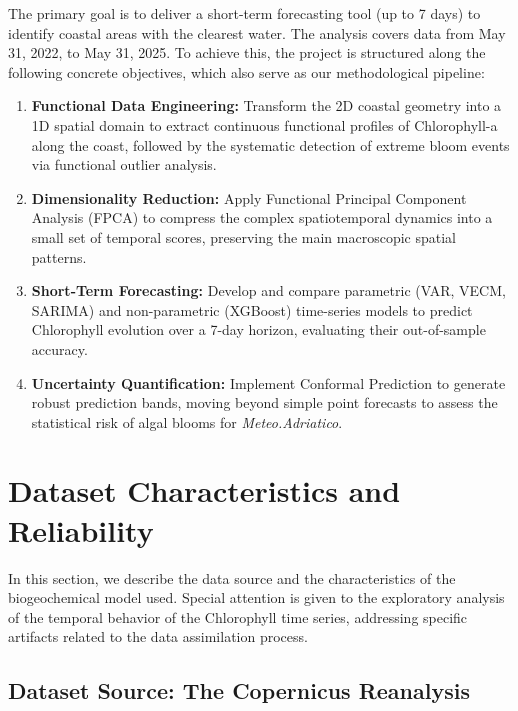 The primary goal is to deliver a short-term forecasting tool (up to 7 days) to identify coastal areas with the clearest water. The analysis covers data from May 31, 2022, to May 31, 2025. To achieve this, the project is structured along the following concrete objectives, which also serve as our methodological pipeline:

\begin{enumerate}
    \item \textbf{Functional Data Engineering:} Transform the 2D coastal geometry into a 1D spatial domain to extract continuous functional profiles of Chlorophyll-a along the coast, followed by the systematic detection of extreme bloom events via functional outlier analysis.
    \item \textbf{Dimensionality Reduction:} Apply Functional Principal Component Analysis (FPCA) to compress the complex spatiotemporal dynamics into a small set of temporal scores, preserving the main macroscopic spatial patterns.
    \item \textbf{Short-Term Forecasting:} Develop and compare parametric (VAR, VECM, SARIMA) and non-parametric (XGBoost) time-series models to predict Chlorophyll evolution over a 7-day horizon, evaluating their out-of-sample accuracy.
    \item \textbf{Uncertainty Quantification:} Implement Conformal Prediction to generate robust prediction bands, moving beyond simple point forecasts to assess the statistical risk of algal blooms for \textit{Meteo.Adriatico}.
\end{enumerate}













\newpage
\section{Dataset Characteristics and Reliability}
\label{sec:data_characteristics_and_reliability}

In this section, we describe the data source and the characteristics of the biogeochemical model used. Special attention is given to the exploratory analysis of the temporal behavior of the Chlorophyll time series, addressing specific artifacts related to the data assimilation process.

\subsection{Dataset Source: The Copernicus Reanalysis}

